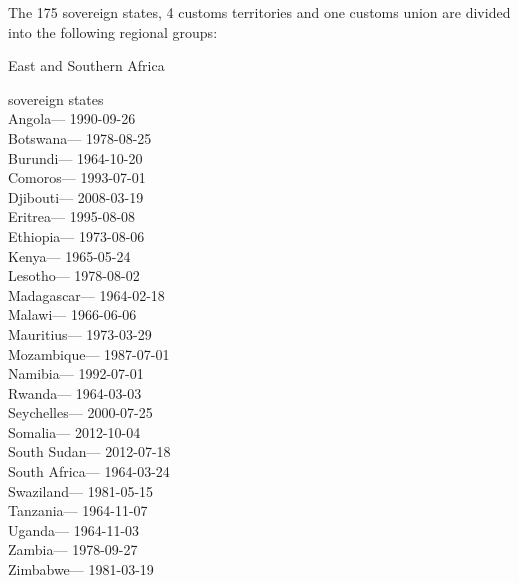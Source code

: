 The 175 sovereign states, 4 customs territories and one customs union
are divided into the following regional groups:

East and Southern Africa

sovereign states\\
\hspace*{0.333em}Angola--- 1990-09-26\\
\hspace*{0.333em}Botswana--- 1978-08-25\\
\hspace*{0.333em}Burundi--- 1964-10-20\\
\hspace*{0.333em}Comoros--- 1993-07-01\\
\hspace*{0.333em}Djibouti--- 2008-03-19\\
\hspace*{0.333em}Eritrea--- 1995-08-08\\
\hspace*{0.333em}Ethiopia--- 1973-08-06\\
\hspace*{0.333em}Kenya--- 1965-05-24\\
\hspace*{0.333em}Lesotho--- 1978-08-02\\
\hspace*{0.333em}Madagascar--- 1964-02-18\\
\hspace*{0.333em}Malawi--- 1966-06-06\\
\hspace*{0.333em}Mauritius--- 1973-03-29\\
\hspace*{0.333em}Mozambique--- 1987-07-01\\
\hspace*{0.333em}Namibia--- 1992-07-01\\
\hspace*{0.333em}Rwanda--- 1964-03-03\\
\hspace*{0.333em}Seychelles--- 2000-07-25\\
\hspace*{0.333em}Somalia--- 2012-10-04\\
\hspace*{0.333em}South Sudan--- 2012-07-18\\
\hspace*{0.333em}South Africa--- 1964-03-24\\
\hspace*{0.333em}Swaziland--- 1981-05-15\\
\hspace*{0.333em}Tanzania--- 1964-11-07\\
\hspace*{0.333em}Uganda--- 1964-11-03\\
\hspace*{0.333em}Zambia--- 1978-09-27\\
\hspace*{0.333em}Zimbabwe--- 1981-03-19

